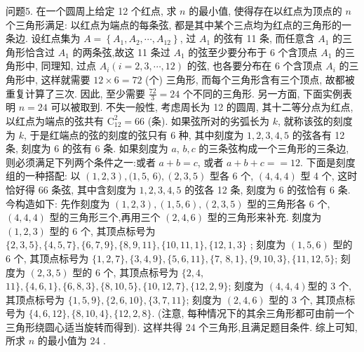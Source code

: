 问题5. 在一个圆周上给定 12 个红点, 求 $n$ 的最小值, 使得存在以红点为顶点的 $n$ 个三角形满足: 以红点为端点的每条弦, 都是其中某个三点均为红点的三角形的一条边.
设红点集为 $A=\left\{A_1, A_2, \cdots, A_{12}\right\}$, 过 $A_1$ 的弦有 11 条, 而任意含 $A_1$ 的三角形恰含过 $A_1$ 的两条弦,故这 11 条过 $A_1$ 的弦至少要分布于 6 个含顶点 $A_1$ 的三角形中, 同理知, 过点 $A_i(i=2,3, \cdots, 12)$ 的弦, 也各要分布在 6 个含顶点 $A_i$ 的三角形中, 这样就需要 $12 \times 6=72$ (个) 三角形, 而每个三角形含有三个顶点, 故都被重复计算了三次.
因此, 至少需要 $\frac{72}{3}=24$ 个不同的三角形.
另一方面, 下面实例表明 $n=24$ 可以被取到.
不失一般性, 考虑周长为 12 的圆周, 其十二等分点为红点, 以红点为端点的弦共有 $\mathrm{C}_{12}^2=66$ (条). 如果弦所对的劣弧长为 $k$, 就称该弦的刻度为 $k$, 于是红端点的弦的刻度的弦只有 6 种, 其中刻度为 $1,2,3,4,5$ 的弦各有 12 条, 刻度为 6 的弦有 6 条.
如果刻度为 $a$, $b, c$ 的三条弦构成一个三角形的三条边, 则必须满足下列两个条件之一:或者 $a+b=c$, 或者 $a+b+c==12$. 下面是刻度组的一种搭配: 以 $(1,2,3),(1,5$, $6),(2,3,5)$ 型各 6 个, $(4,4,4)$ 型 4 个, 这时恰好得 66 条弦, 其中含刻度为 $1,2,3,4,5$ 的弦各 12 条, 刻度为 6 的弦恰有 6 条.
今构造如下: 先作刻度为 $(1,2,3) ,(1,5,6) ,(2,3,5)$ 型的三角形各 6 个, $(4,4,4)$ 型的三角形三个,再用三个 $(2,4,6)$ 型的三角形来补充.
刻度为 $(1,2,3)$ 型的 6 个, 其顶点标号为 $\{2,3,5\},\{4,5,7\},\{6,7,9\},\{8,9,11\},\{10,11,1\},\{12,1,3\}$ ; 刻度为 $(1,5,6)$ 型的 6 个, 其顶点标号为 $\{1,2,7\},\{3,4,9\},\{5,6,11\},\{7$, $8,1\},\{9,10,3\},\{11,12,5\}$; 刻度为 $(2,3,5)$ 型的 6 个, 其顶点标号为 $\{2,4$, $11\},\{4,6,1\},\{6,8,3\},\{8,10,5\},\{10,12,7\},\{12,2,9\}$; 刻度为 $(4,4,4)$型的 3 个,其顶点标号为 $\{1,5,9\},\{2,6,10\},\{3,7,11\}$; 刻度为 $(2,4,6)$ 型的 3 个, 其顶点标号为 $\{4,6,12\},\{8,10,4\},\{12,2,8\}$. (注意, 每种情况下的其余三角形都可由前一个三角形绕圆心适当旋转而得到). 这样共得 24 个三角形,且满足题目条件.
综上可知,所求 $n$ 的最小值为 24 .



